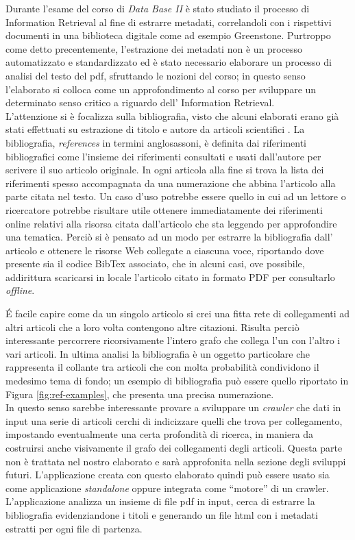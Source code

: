 Durante l'esame del corso di \textit{Data Base II} è stato studiato il processo di Information Retrieval al fine di estrarre metadati, correlandoli con i rispettivi documenti in una biblioteca digitale come ad esempio Greenstone. Purtroppo come detto precentemente, l'estrazione dei metadati non è un processo automatizzato e standardizzato ed è stato necessario elaborare un processo di analisi del testo del pdf, sfruttando le nozioni del corso; in questo senso l'elaborato si colloca come un approfondimento al corso per sviluppare un determinato senso critico a riguardo dell' Information Retrieval.\\
L'attenzione si è focalizza sulla bibliografia, visto che alcuni elaborati erano già stati effettuati su estrazione di titolo e autore da articoli scientifici \cite{Tarocchi}. La bibliografia, \textit{references} in  termini anglosassoni, è definita dai riferimenti bibliografici come l'insieme dei riferimenti consultati e usati dall'autore per scrivere il suo articolo originale. In ogni articola alla fine si trova la lista dei riferimenti spesso accompagnata da una numerazione che abbina l'articolo alla parte citata nel testo. Un caso d'uso potrebbe essere quello in cui ad un lettore o ricercatore potrebbe risultare utile ottenere immediatamente dei riferimenti online relativi alla risorsa citata dall'articolo che sta leggendo per approfondire una tematica. Perciò si è pensato ad un modo per estrarre la bibliografia dall' articolo e ottenere le risorse Web collegate a ciascuna voce, riportando dove presente sia il codice BibTex associato, che in alcuni casi, ove possibile, addirittura scaricarsi in locale l'articolo citato in formato PDF per consultarlo \textit{offline}.

\'E facile capire come da un singolo articolo si crei una fitta rete di collegamenti ad altri articoli che a loro volta contengono altre citazioni. Risulta perciò interessante percorrere ricorsivamente l'intero grafo che collega l'un con l'altro i vari articoli. In ultima analisi la bibliografia è un oggetto particolare che rappresenta il collante tra articoli che con molta probabilità condividono il medesimo tema di fondo; un esempio di bibliografia può essere quello riportato in Figura \ref{fig:ref-examples}, che presenta una precisa numerazione.\\
In questo senso sarebbe interessante provare a sviluppare un \textit{crawler} che dati in input una serie di articoli cerchi di indicizzare quelli che trova per collegamento, impostando eventualmente una certa profondità di ricerca, in maniera da costruirsi anche visivamente il grafo dei collegamenti degli articoli. Questa parte non è trattata nel nostro elaborato e sarà approfonita nella sezione degli sviluppi futuri. L'applicazione creata con questo elaborato quindi può essere usato sia come applicazione \textit{standalone} oppure integrata come ``motore'' di un crawler. L'applicazione analizza un insieme di file pdf in input, cerca di estrarre la bibliografia evidenziandone i titoli e generando un file html con i metadati estratti per ogni file di partenza. 



